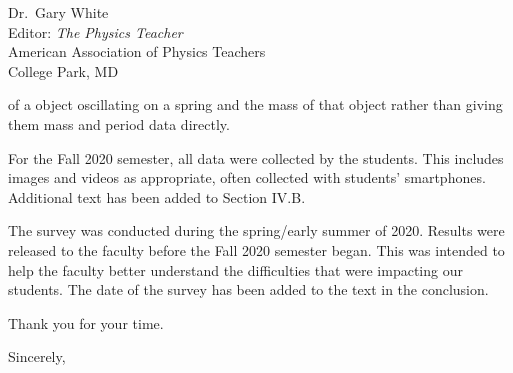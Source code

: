 \documentclass{letter}
\makeatletter
\renewcommand{\closing}[1]{\par\nobreak\vspace{\parskip}%
  \stopbreaks
  \noindent
  \ifx\@empty\fromaddress\else
  \hspace*{\longindentation}\fi
  \parbox{\indentedwidth}{\raggedright
       \ignorespaces #1\\[2\medskipamount]%
       \ifx\@empty\fromsig
           \fromname
       \else \fromsig \fi\strut}%
   \par}
\makeatother
\begin{document}
\begin{letter}{Dr.\ Gary White \\ Editor: \textit{The Physics Teacher} \\ American Association
    of Physics Teachers \\ College Park, MD}
\begin{description}
    of a object oscillating on a spring and the mass of that object rather than giving them
    mass and period data directly. 
    \item[Details about Fall 2020] For the Fall 2020 semester, all data were collected by the
    students.  This includes images and videos as appropriate, often collected with students'
    smartphones. Additional text has been added to Section \textrm{IV}.B.
    \item[Details about the survey] The survey was conducted during the spring/early summer of
    2020.  Results were released to the faculty before the Fall 2020 semester began.  This was
    intended to help the faculty better understand the difficulties that were impacting our
    students. The date of the survey has been added to the text in the conclusion.
  \end{description}

  Thank you for your time.
  
  \closing{Sincerely,}
    
\end{letter}
\end{document}
